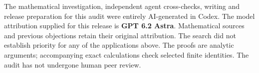\documentclass[11pt]{article}
\begin{document}
The mathematical investigation, independent agent cross-checks, writing and release preparation for this audit were entirely AI-generated in Codex. The model attribution supplied for this release is \textbf{GPT 6.2 Astra}. Mathematical sources and previous objections retain their original attribution. The search did not establish priority for any of the applications above. The proofs are analytic arguments; accompanying exact calculations check selected finite identities. The audit has not undergone human peer review.
\end{document}

